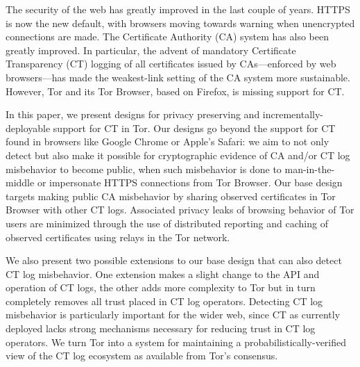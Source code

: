 The security of the web has greatly improved in the last couple of years. HTTPS
is now the new default, with browsers moving towards warning when unencrypted
connections are made. The Certificate Authority (CA) system has also been
greatly improved. In particular, the advent of mandatory Certificate
Transparency (CT) logging of all certificates issued by CAs---enforced by web
browsers---has made the weakest-link setting of the CA system more sustainable.
However, Tor and its Tor Browser, based on Firefox, is missing support for CT.

In this paper, we present designs for privacy preserving and
incrementally-deployable support for CT in Tor. Our designs go beyond the
support for CT found in browsers like Google Chrome or Apple's Safari: we aim to
not only detect but also make it possible for cryptographic evidence of CA
and/or CT log misbehavior to become public, when such misbehavior is done to
man-in-the-middle or impersonate HTTPS connections from Tor Browser. Our base
design targets making public CA misbehavior by sharing observed certificates in
Tor Browser with other CT logs. Associated privacy leaks of browsing behavior of
Tor users are minimized through the use of distributed reporting and caching of
observed certificates using relays in the Tor network.

We also present two possible extensions to our base design that can also detect
CT log misbehavior. One extension makes a slight change to the API and operation
of CT logs, the other adds more complexity to Tor but in turn completely removes
all trust placed in CT log operators. Detecting CT log misbehavior is
particularly important for the wider web, since CT as currently deployed lacks
strong mechanisms necessary for reducing trust in CT log operators.
We turn Tor into a system for maintaining a probabilistically-verified view of
the CT log ecosystem as available from Tor’s consensus.

